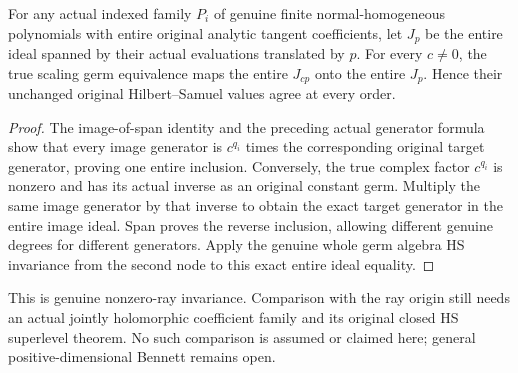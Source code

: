 \begin{theorem}
\label{hir:actual-translated-normal-family-nonzero-ray-hs}
\leanok
For any actual indexed family $P_i$ of genuine finite normal-homogeneous
polynomials with entire original analytic tangent coefficients, let
$J_p$ be the entire ideal spanned by their actual evaluations translated
by $p$. For every $c\ne0$, the true scaling germ equivalence maps the
entire $J_{cp}$ onto the entire $J_p$. Hence their unchanged original
Hilbert--Samuel values agree at every order.
\end{theorem}
\begin{proof}
The image-of-span identity and the preceding actual generator formula
show that every image generator is $c^{q_i}$ times the corresponding
original target generator, proving one entire inclusion. Conversely,
the true complex factor $c^{q_i}$ is nonzero and has its actual inverse
as an original constant germ. Multiply the same image generator by that
inverse to obtain the exact target generator in the entire image ideal.
Span proves the reverse inclusion, allowing different genuine degrees
for different generators. Apply the genuine whole germ algebra HS
invariance from the second node to this exact entire ideal equality.
\end{proof}

This is genuine nonzero-ray invariance. Comparison with the ray origin
still needs an actual jointly holomorphic coefficient family and its
original closed HS superlevel theorem. No such comparison is assumed or
claimed here; general positive-dimensional Bennett remains open.
